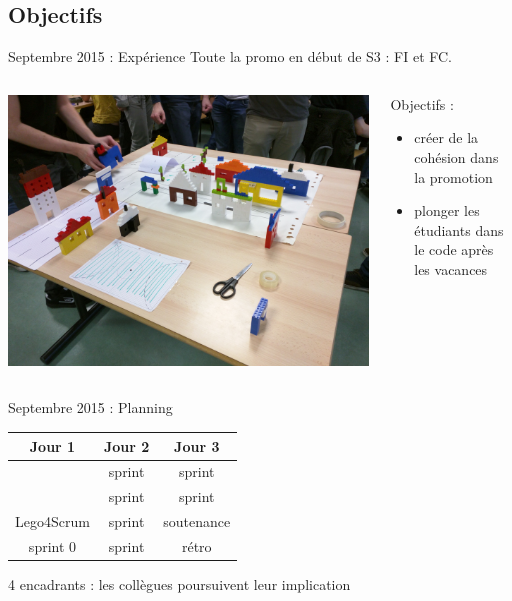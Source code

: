 \documentclass{beamer}
\begin{document}
\subsection{Objectifs}
\begin{frame}{Septembre 2015 : Expérience}
  Toute la promo en début de S3 : FI et FC.

  \begin{columns}
    \begin{column}{0.5\textwidth}
      \begin{center}
        \includegraphics[width=\textwidth]{includes/201509_lego.jpg}      
      \end{center}
    \end{column}
    \begin{column}{0.5\textwidth}
  Objectifs : 
  \begin{itemize}
    \item créer de la cohésion dans la promotion
    \item plonger les étudiants dans le code après les vacances
  \end{itemize}
    \end{column}
  \end{columns}
\end{frame}

\begin{frame}{Septembre 2015 : Planning}
  \begin{center}
    \begin{tabular}{| c | c | c |}
      \hline
      \textbf{Jour 1} & \textbf{Jour 2} & \textbf{Jour 3}  \\
      \hline \hline
                      & sprint          & sprint           \\
      \hline
                      & sprint          & sprint           \\
      \hline \hline
      Lego4Scrum      & sprint          & soutenance       \\
      \hline
      sprint 0        & sprint          & rétro            \\
      \hline
    \end{tabular}
  \end{center}
    4 encadrants : les collègues poursuivent leur implication
\end{frame}
\end{document}
